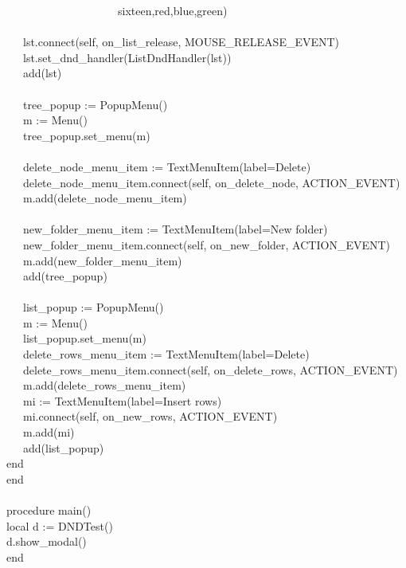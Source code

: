 {\>   \ \ \ \ \ \ \ \ \ \ \ \ \ \ \ \ \ \ \ \ sixteen,red,blue,green{\textquotedbl}) \\
\ \\
\>   \ \ \ lst.connect(self,
{\textquotedbl}on\_list\_release{\textquotedbl},
MOUSE\_RELEASE\_EVENT) \\
\>   \ \ \ lst.set\_dnd\_handler(ListDndHandler(lst)) \\
\>   \ \ \ add(lst) \\
\ \\
\>   \ \ \ tree\_popup := PopupMenu() \\
\>   \ \ \ m := Menu() \\
\>   \ \ \ tree\_popup.set\_menu(m) \\
\ \\
\>   \ \ \ delete\_node\_menu\_item :=
TextMenuItem({\textquotedbl}label=Delete{\textquotedbl}) \\
\>   \ \ \ delete\_node\_menu\_item.connect(self,
{\textquotedbl}on\_delete\_node{\textquotedbl}, ACTION\_EVENT) \\
\>   \ \ \ m.add(delete\_node\_menu\_item) \\
\ \\
\>   \ \ \ new\_folder\_menu\_item :=
TextMenuItem({\textquotedbl}label=New folder{\textquotedbl}) \\
\>   \ \ \ new\_folder\_menu\_item.connect(self,
{\textquotedbl}on\_new\_folder{\textquotedbl}, ACTION\_EVENT) \\
\>   \ \ \ m.add(new\_folder\_menu\_item) \\
\>   \ \ \ add(tree\_popup) \\
\ \\
\>   \ \ \ list\_popup := PopupMenu() \\
\>   \ \ \ m := Menu() \\
\>   \ \ \ list\_popup.set\_menu(m) \\
\>   \ \ \ delete\_rows\_menu\_item :=
TextMenuItem({\textquotedbl}label=Delete{\textquotedbl}) \\
\>   \ \ \ delete\_rows\_menu\_item.connect(self,
{\textquotedbl}on\_delete\_rows{\textquotedbl}, ACTION\_EVENT) \\
\>   \ \ \ m.add(delete\_rows\_menu\_item) \\
\>   \ \ \ mi := TextMenuItem({\textquotedbl}label=Insert
rows{\textquotedbl}) \\
\>   \ \ \ mi.connect(self,
{\textquotedbl}on\_new\_rows{\textquotedbl}, ACTION\_EVENT) \\
\>   \ \ \ m.add(mi) \\
\>   \ \ \ add(list\_popup) \\
\>   end \\
end \\
\ \\
procedure main() \\
\>   local d := DNDTest() \\
\>   d.show\_modal() \\
end
}

